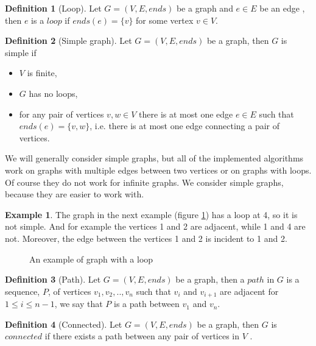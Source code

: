 \documentclass{report}
\theoremstyle{plain}
\theoremstyle{definition}
\newtheorem{definition}{Definition}
\newtheorem{example}{Example}
\theoremstyle{remark}
\numberwithin{definition}{chapter}
\numberwithin{example}{chapter}
\numberwithin{figure}{chapter}
\numberwithin{theorem}{chapter}
\numberwithin{lemma}{chapter}
\begin{document}
\begin{definition}[Loop]
Let $G = (V, E, ends)$ be a graph and $e \in E$ be an edge , then $e$ is a $loop$ if $ends(e) = \{v\}$ for some vertex $v \in V$.
\end{definition}

\begin{definition}[Simple graph]
Let $G = (V, E, ends)$ be a graph, then $G$ is simple if
\begin{itemize}
\item $V$ is finite,
\item $G$ has no loops,
\item for any pair of vertices $v,w \in V$ there is at most one edge $e \in E$ such that $ends(e) = \{v, w\}$, i.e. there is at most one edge connecting a pair of vertices.
\end{itemize}
\end{definition}

We will generally consider simple graphs, but all of the implemented algorithms work on graphs with multiple edges between two vertices or on graphs with loops. Of course they do not work for infinite graphs. We consider simple graphs, because they are easier to work with.

\begin{example}
The graph in the next example (figure \ref{loop}) has a loop at 4, so it is not simple. And for example the vertices 1 and 2 are adjacent, while 1 and 4 are not. Moreover, the edge between the vertices 1 and 2 is incident to 1 and 2.
\begin{figure}[h]
\center
{}
\caption{An example of graph with a loop}
\label{loop}
\end{figure}
\end{example}

\begin{definition}[Path]
Let $G = (V, E, ends)$ be a graph, then a $path$ in $G$ is a sequence, $P$, of vertices $v_1,v_2,..,v_n$ such that $v_i$ and $v_{i+1}$ are adjacent for $1 \leq i \leq n - 1$, we say that $P$ is a path between $v_1$ and $v_n$.
\end{definition}

\begin{definition}[Connected]
Let $G = (V, E, ends)$ be a graph, then $G$ is $connected$ if there exists a path between any pair of vertices in $V$ \cite{bollobas1998modern}.
\end{definition}
\end{document}
